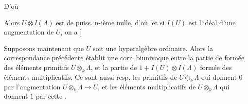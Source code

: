
 D'où

Alors $U\otimes I(\Lambda)$ est de puiss. n-ième
nulle, d'où
[et si $I(U)$ est l'idéal d'une
augmentation de $U$, on a
]

Supposons maintenant que $U$ soit une
hyperalgèbre ordinaire. Alors la correspondance
précédente établit une corr. biunivoque
entre la partie de
formée
des éléments primitifs  $U\otimes_k\Lambda$, et
la partie de $1+I(U)\otimes I(\Lambda)$
formée des éléments multiplicatifs. Ce
sont aussi resp. les primitifs de
$U\otimes_k\Lambda$ qui donnent $0$ par l'augmentation
$U\otimes_k\Lambda\longrightarrow U$, et les éléments multiplicatifs de
$U\otimes_k\Lambda$ qui donnent $1$ par cette .

